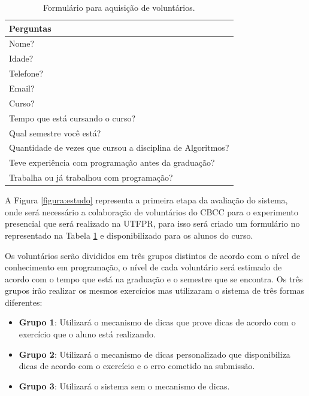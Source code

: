 \begin{table}[]
	\centering
	\captionsetup{justification=centering}
	\caption{Formulário para aquisição de voluntários.}
	\label{tabela:formulário}
	\begin{tabular}{l}
		\hline
		Perguntas                        \\ \hline
		Nome?                            \\
		Idade?                           \\
		Telefone?                        \\
		Email?                           \\
		Curso?                           \\
		Tempo que está cursando o curso? \\
		Qual semestre você está?         \\ 
		Quantidade de vezes que cursou a disciplina de Algoritmos?  \\ 
		Teve experiência com programação antes da graduação? \\
		Trabalha ou já trabalhou com programação? \\ \hline
	\end{tabular}
\end{table}

A Figura \ref{figura:estudo} representa a primeira etapa da avaliação do sistema, onde será necessário a colaboração de voluntários do CBCC para o experimento presencial que será realizado na UTFPR, para isso será criado um formulário no  representado na Tabela \ref{tabela:formulário} e disponibilizado  para os alunos do curso.

Os voluntários serão divididos em três grupos distintos de acordo com o nível de conhecimento em programação, o nível de cada voluntário será estimado de acordo com o tempo que está na graduação e o semestre que se encontra. Os três grupos irão realizar os mesmos exercícios mas utilizaram o sistema de três formas diferentes:

\begin{itemize}
	\item \textbf{Grupo 1}: Utilizará o mecanismo de dicas que prove dicas de acordo com o exercício que o aluno está realizando.
	
	\item \textbf{Grupo 2}: Utilizará o mecanismo de dicas personalizado que disponibiliza dicas de acordo com o exercício e o erro cometido na submissão.

	\item \textbf{Grupo 3}: Utilizará o sistema sem o mecanismo de dicas.
\end{itemize}

